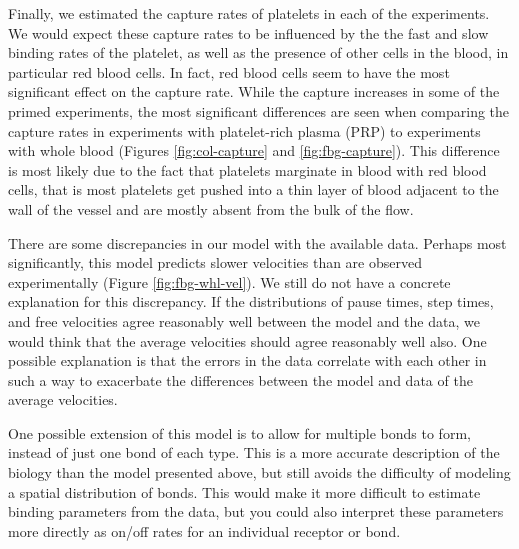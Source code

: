 Finally, we estimated the capture rates of platelets in each of the
experiments. We would expect these capture rates to be influenced by
the the fast and slow binding rates of the platelet, as well as the
presence of other cells in the blood, in particular red blood
cells. In fact, red blood cells seem to have the most significant
effect on the capture rate. While the capture increases in some of the
primed experiments, the most significant differences are seen when
comparing the capture rates in experiments with platelet-rich plasma
(PRP) to experiments with whole blood (Figures \ref{fig:col-capture}
and \ref{fig:fbg-capture}). This difference is most likely due to the
fact that platelets marginate in blood with red blood cells, that is
most platelets get pushed into a thin layer of blood adjacent to the
wall of the vessel and are mostly absent from the bulk of the flow.

There are some discrepancies in our model with the available
data. Perhaps most significantly, this model predicts slower
velocities than are observed experimentally (Figure
\ref{fig:fbg-whl-vel}). We still do not have a concrete explanation
for this discrepancy. If the distributions of pause times, step times,
and free velocities agree reasonably well between the model and the
data, we would think that the average velocities should agree
reasonably well also. One possible explanation is that the errors in
the data correlate with each other in such a way to exacerbate the
differences between the model and data of the average velocities.

One possible extension of this model is to allow for multiple bonds to
form, instead of just one bond of each type. This is a more accurate
description of the biology than the model presented above, but still
avoids the difficulty of modeling a spatial distribution of
bonds. This would make it more difficult to estimate binding
parameters from the data, but you could also interpret these
parameters more directly as on/off rates for an individual receptor or
bond. 








